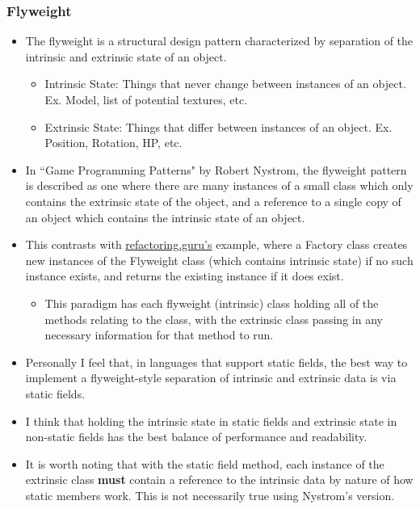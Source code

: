 \documentclass{article}
\begin{document}
\subsubsection{Flyweight}
\begin{itemize}
    \item The flyweight is a structural design pattern characterized by separation of the intrinsic and extrinsic state of an object.
    \begin{itemize}
        \item Intrinsic State: Things that never change between instances of an object. Ex. Model, list of potential textures, etc.
        \item Extrinsic State: Things that differ between instances of an object. Ex. Position, Rotation, HP, etc.
    \end{itemize}
    \item In ``Game Programming Patterns" by Robert Nystrom, the flyweight pattern is described as one where there are many instances of a small class which only contains the extrinsic state of the object, and a reference to a single copy of an object which contains the intrinsic state of an object.
    \item This contrasts with \href{https://refactoring.guru/design-patterns/flyweight}{refactoring.guru's} example, where a Factory class creates new instances of the Flyweight class (which contains intrinsic state) if no such instance exists, and returns the existing instance if it does exist. 
    \begin{itemize}
        \item This paradigm has each flyweight (intrinsic) class holding all of the methods relating to the class, with the extrinsic class passing in any necessary information for that method to run.
    \end{itemize}
    \item Personally I feel that, in languages that support static fields, the best way to implement a flyweight-style separation of intrinsic and extrinsic data is via static fields. 
    \item I think that holding the intrinsic state in static fields and extrinsic state in non-static fields has the best balance of performance and readability.
    \item It is worth noting that with the static field method, each instance of the extrinsic class \textbf{must} contain a reference to the intrinsic data by nature of how static members work. This is not necessarily true using Nystrom's version.
\end{itemize}
\end{document}

